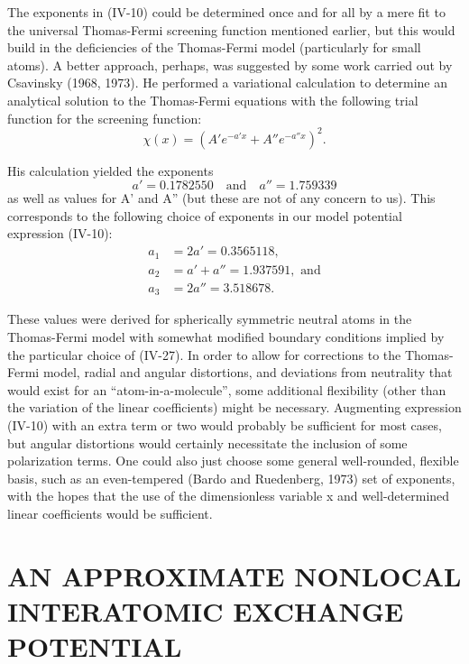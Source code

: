 \documentclass[12pt,letterpaper]{report}
\begin{document}
The exponents in (IV-10) could be determined once and for all by a mere fit to the universal Thomas-Fermi screening function mentioned earlier, but this would build in the deficiencies of the Thomas-Fermi model (particularly for small atoms). A better approach, perhaps, was suggested by some work carried out by Csavinsky (1968, 1973). He performed a variational calculation to determine an analytical solution to the Thomas-Fermi equations with the following trial function for the screening function:
\begin{equation}
\chi(x) = (A'e^{-a'x} + A''e^{-a''x})^2.
\end{equation}

His calculation yielded the exponents
\begin{equation}
a' = 0.1782550 \quad \text{and} \quad a'' = 1.759339
\end{equation}
as well as values for A' and A'' (but these are not of any concern to us). This corresponds to the following choice of exponents in our model potential expression (IV-10):
\begin{align}
a_1 &= 2a' = 0.3565118,\nonumber\\
a_2 &= a' + a'' = 1.937591, \text{ and}\nonumber\\
a_3 &= 2a'' = 3.518678.
\end{align}

These values were derived for spherically symmetric neutral atoms in the Thomas-Fermi model with somewhat modified boundary conditions implied by the particular choice of (IV-27). In order to allow for corrections to the Thomas-Fermi model, radial and angular distortions, and deviations from neutrality that would exist for an ``atom-in-a-molecule'', some additional flexibility (other than the variation of the linear coefficients) might be necessary. Augmenting expression (IV-10) with an extra term or two would probably be sufficient for most cases, but angular distortions would certainly necessitate the inclusion of some polarization terms. One could also just choose some general well-rounded, flexible basis, such as an even-tempered (Bardo and Ruedenberg, 1973) set of exponents, with the hopes that the use of the dimensionless variable x and well-determined linear coefficients would be sufficient.

\chapter{AN APPROXIMATE NONLOCAL INTERATOMIC EXCHANGE POTENTIAL}
\end{document}
